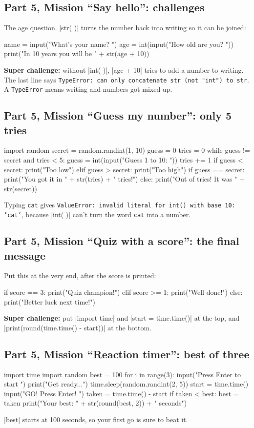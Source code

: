 \subsection*{Part 5, Mission ``Say hello'': challenges}
The age question. \py|str( )| turns the number back into writing so it can be joined:
\begin{codenonum}
name = input("What's your name? ")
age = int(input("How old are you? "))
print("In 10 years you will be " + str(age + 10))
\end{codenonum}
\textbf{Super challenge:} without \py|int( )|, \py|age + 10| tries to add a number to writing. The last line says \texttt{TypeError: can only concatenate str (not "int") to str}. A \texttt{TypeError} means writing and numbers got mixed up.

\subsection*{Part 5, Mission ``Guess my number'': only 5 tries}
\begin{codenonum}
import random
secret = random.randint(1, 10)
guess = 0
tries = 0
while guess != secret and tries < 5:
    guess = int(input("Guess 1 to 10: "))
    tries += 1
    if guess < secret:
        print("Too low")
    elif guess > secret:
        print("Too high")
if guess == secret:
    print("You got it in " + str(tries) + " tries!")
else:
    print("Out of tries! It was " + str(secret))
\end{codenonum}
Typing \texttt{cat} gives \texttt{ValueError: invalid literal for int() with base 10: 'cat'}, because \py|int( )| can't turn the word \texttt{cat} into a number.

\subsection*{Part 5, Mission ``Quiz with a score'': the final message}
Put this at the very end, after the score is printed:
\begin{codenonum}
if score == 3:
    print("Quiz champion!")
elif score >= 1:
    print("Well done!")
else:
    print("Better luck next time!")
\end{codenonum}
\textbf{Super challenge:} put \py|import time| and \py|start = time.time()| at the top, and \py|print(round(time.time() - start))| at the bottom.

\subsection*{Part 5, Mission ``Reaction timer'': best of three}
\begin{codenonum}
import time
import random
best = 100
for i in range(3):
    input("Press Enter to start ")
    print("Get ready...")
    time.sleep(random.randint(2, 5))
    start = time.time()
    input("GO! Press Enter! ")
    taken = time.time() - start
    if taken < best:
        best = taken
print("Your best: " + str(round(best, 2)) + " seconds")
\end{codenonum}
\py|best| starts at 100 seconds, so your first go is sure to beat it.

